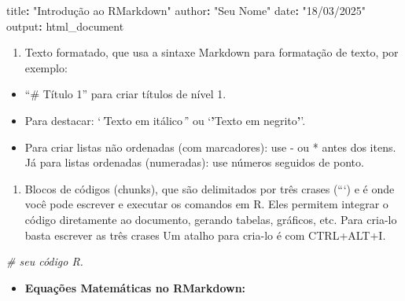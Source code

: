 \documentclass[
]{book}
\newenvironment{Shaded}{\begin{snugshade}}{\end{snugshade}}
\newcommand{\CommentTok}[1]{\textcolor[rgb]{0.56,0.35,0.01}{\textit{#1}}}
\newcommand{\NormalTok}[1]{#1}
\newcommand{\SpecialCharTok}[1]{\textcolor[rgb]{0.81,0.36,0.00}{\textbf{#1}}}
\newcommand{\StringTok}[1]{\textcolor[rgb]{0.31,0.60,0.02}{#1}}
\providecommand{\tightlist}{%
  \setlength{\itemsep}{0pt}\setlength{\parskip}{0pt}}
\begin{document}
\begin{Shaded}
\begin{Highlighting}[]
\NormalTok{title}\SpecialCharTok{:} \StringTok{"Introdução ao RMarkdown"}
\NormalTok{author}\SpecialCharTok{:} \StringTok{"Seu Nome"}
\NormalTok{date}\SpecialCharTok{:} \StringTok{"18/03/2025"}
\NormalTok{output}\SpecialCharTok{:}\NormalTok{ html\_document}
\end{Highlighting}
\end{Shaded}

\begin{enumerate}
\def\labelenumi{\arabic{enumi}.}
\setcounter{enumi}{1}
\tightlist
\item
  Texto formatado, que usa a sintaxe Markdown para formatação de texto, por exemplo:
\end{enumerate}

\begin{itemize}
\tightlist
\item
  ``\# Título 1'' para criar títulos de nível 1.
\item
  Para destacar: `\emph{'}Texto em itálico\emph{'}' ou `\textbf{'}Texto em negrito\textbf{'}'.
\item
  Para criar listas não ordenadas (com marcadores): use - ou * antes dos itens. Já para listas ordenadas (numeradas): use números seguidos de ponto.
\end{itemize}

\begin{enumerate}
\def\labelenumi{\arabic{enumi}.}
\setcounter{enumi}{2}
\tightlist
\item
  Blocos de códigos (chunks), que são delimitados por três crases (```) e é onde você pode escrever e executar os comandos em R. Eles permitem integrar o código diretamente ao documento, gerando tabelas, gráficos, etc.
  Para cria-lo basta escrever as três crases
  Um atalho para cria-lo é com CTRL+ALT+I.
\end{enumerate}

\begin{Shaded}
\begin{Highlighting}[]
\CommentTok{\# seu código R.}
\end{Highlighting}
\end{Shaded}

\begin{itemize}
\tightlist
\item
  \textbf{Equações Matemáticas no RMarkdown:}
\end{itemize}
\end{document}
